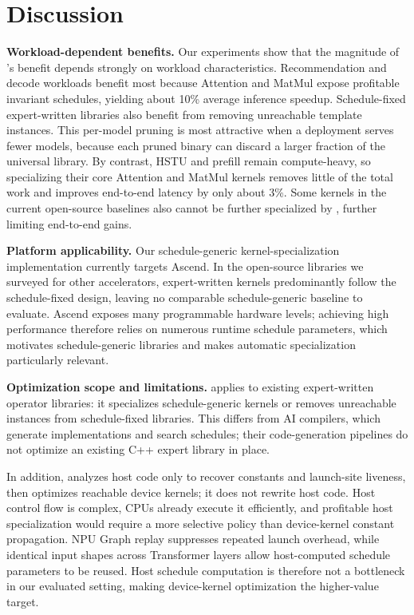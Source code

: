 \section{Discussion}
\label{sec:discussion}

\textbf{Workload-dependent benefits.}
Our experiments show that the magnitude of \mysys's benefit depends strongly on
workload characteristics. Recommendation and decode workloads benefit most
because Attention and MatMul expose profitable invariant schedules, yielding
about 10\% average inference speedup. Schedule-fixed expert-written libraries
also benefit from removing unreachable template instances. This per-model
pruning is most attractive when a deployment serves fewer models, because each
pruned binary can discard a larger fraction of the universal library. By
contrast, HSTU and prefill remain compute-heavy, so specializing their core
Attention and MatMul kernels removes little of the total work and improves
end-to-end latency by only about 3\%. Some kernels in the current open-source
baselines also cannot be further specialized by \mysys, further limiting
end-to-end gains.

\textbf{Platform applicability.}
Our schedule-generic kernel-specialization implementation currently targets
Ascend. In the open-source libraries we surveyed for other accelerators,
expert-written kernels predominantly follow the schedule-fixed design, leaving
no comparable schedule-generic baseline to evaluate. Ascend exposes many
programmable hardware levels; achieving high performance therefore relies on
numerous runtime schedule parameters, which motivates schedule-generic
libraries and makes automatic specialization particularly relevant.

\textbf{Optimization scope and limitations.}
\mysys applies to existing expert-written operator libraries: it specializes
schedule-generic kernels or removes unreachable instances from schedule-fixed
libraries. This differs from AI compilers, which generate implementations and
search schedules; their code-generation pipelines do not optimize an existing
C++ expert library in place. 

In addition, \mysys analyzes host code only to recover constants
and launch-site liveness, then optimizes reachable device kernels; it does not
rewrite host code. Host control flow is complex, CPUs already execute it
efficiently, and profitable host specialization would require a more selective
policy than device-kernel constant propagation. NPU Graph replay suppresses
repeated launch overhead, while identical input shapes across Transformer
layers allow host-computed schedule parameters to be reused. Host schedule
computation is therefore not a bottleneck in our evaluated setting, making
device-kernel optimization the higher-value target.
